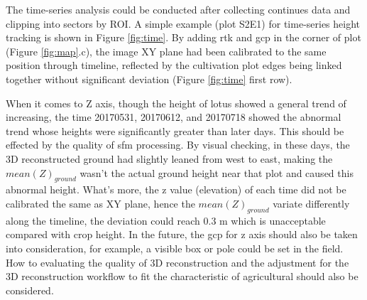 \documentclass[doublespacing]{configs/bmcart}
\begin{document}
The time-series analysis could be conducted after collecting continues data and clipping into sectors by ROI. A simple example (plot S2E1) for time-series height tracking is shown in Figure \ref{fig:time}. By adding \acrshort*{rtk} and \acrshort*{gcp} in the corner of plot (Figure \ref{fig:map}.c), the image XY plane had been calibrated to the same position through timeline, reflected by the cultivation plot edges being linked together without significant deviation (Figure \ref{fig:time} first row). 

When it comes to Z axis, though the height of lotus showed a general trend of increasing, the time 20170531, 20170612, and 20170718 showed the abnormal trend whose heights were significantly greater than later days. This should be effected by the quality of \acrshort*{sfm} processing. By visual checking, in these days, the 3D reconstructed ground had slightly leaned from west to east, making the $mean(Z)_{ground}$ wasn't the actual ground height near that plot and caused this abnormal height. What's more, the z value (elevation) of each time did not be calibrated the same as XY plane, hence the $mean(Z)_{ground}$ variate differently along the timeline, the deviation could reach 0.3 m which is unacceptable compared with crop height. In the future, the \acrshort*{gcp} for z axis should also be taken into consideration, for example, a visible box or pole could be set in the field. How to evaluating the quality of 3D reconstruction and the adjustment for the 3D reconstruction workflow to fit the characteristic of agricultural should also be considered.
\end{document}
